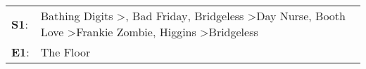 \begin{supertabular}{p{0.03\textwidth}p{0.92\textwidth}}
 \textbf{S1}:  &  Bathing Digits\textsuperscript{} \textgreater {}\textsuperscript{}, \enspace Bad Friday\textsuperscript{}, \enspace Bridgeless\textsuperscript{} \textgreater \enspace Day Nurse\textsuperscript{}, \enspace Booth Love\textsuperscript{} \textgreater \enspace Frankie Zombie\textsuperscript{}, \enspace Higgins\textsuperscript{} \textgreater \enspace Bridgeless\textsuperscript{}  \enspace  \\
 \textbf{E1}:  &                                                                                                                                                                                                                                                                                                                                                                         The Floor\textsuperscript{}  \enspace  \\
\end{supertabular}
